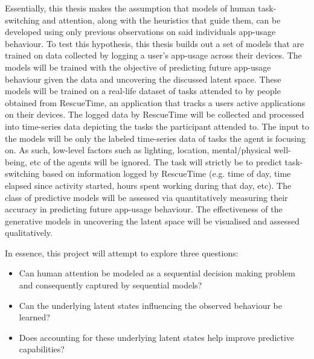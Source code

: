  Essentially, this thesis makes the assumption that models of human task-switching and attention, along with the heuristics that guide them, can be developed using only previous observations on said individuals app-usage behaviour. To test this hypothesis, this thesis builds out a set of models that are trained on data collected by logging a user's app-usage across their devices. The models will be trained with the objective of predicting future app-usage behaviour given the data and uncovering the discussed latent space. These models will be trained on a real-life dataset of tasks attended to by people obtained from RescueTime, an application that tracks a users active applications on their devices. The logged data by RescueTime will be collected and processed into time-series data depicting the tasks the participant attended to. The input to the models will be only the labeled time-series data of tasks the agent is focusing on. As such, low-level factors such as lighting, location, mental/physical well-being, etc of the agents will be ignored. The task will strictly be to predict task-switching based on information logged by RescueTime (e.g. time of day, time elapsed since activity started, hours spent working during that day, etc). The class of predictive models will be assessed via quantitatively measuring their accuracy in predicting future app-usage behaviour. The effectiveness of the generative models in uncovering the latent space will be visualised and assessed qualitatively.

 In essence, this project will attempt to explore three questions:

 \begin{itemize}
     \item Can human attention be modeled as a sequential decision making problem and consequently captured by sequential models?
     \item Can the underlying latent states influencing the observed behaviour be learned?
     \item Does accounting for these underlying latent states help improve predictive capabilities?
 \end{itemize}


